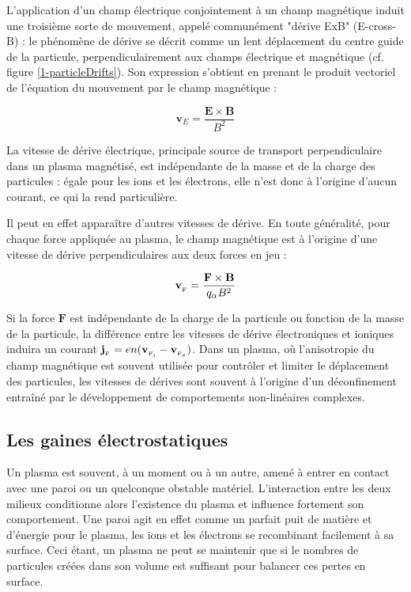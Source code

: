 \begin{refsection}
L'application d'un champ électrique conjointement à un champ magnétique
induit une troisième sorte de mouvement, appelé communément "dérive
ExB" (E-cross-B) : le phénomène de dérive se décrit comme un lent déplacement du
centre guide de la particule, perpendiculairement aux champs électrique et
magnétique (cf. figure \ref{1-particleDrifts}). Son expression s'obtient en
prenant le produit vectoriel de l'équation du mouvement par le champ magnétique
:

\begin{equation}
\mathbf{v}_E=\frac{\mathbf{E}\times\mathbf{B}}{B^2}
\end{equation}

La vitesse de dérive électrique, principale source de transport perpendiculaire
dans un plasma magnétisé, est indépendante de la masse et de la charge des
particules : égale pour les ions et les électrons, elle n'est donc à
l'origine d'aucun courant, ce qui la rend particulière. 

Il peut en effet apparaître d'autres vitesses de dérive. En toute généralité, 
pour chaque force appliquée au plasma, le champ magnétique est à l'origine
d'une vitesse de dérive perpendiculaires aux deux forces en jeu :

\begin{equation}
\mathbf{v}_{_{\text{F}}}=\frac{\mathbf{F}\times\mathbf{B}}{q_\alpha B^2}
\end{equation}

Si la force $\mathbf F$ est indépendante de la charge de la particule ou
fonction de la masse de la particule, la différence entre les vitesses de dérive
électroniques et ioniques induira un courant $\mathbf
j_{_{\text{F}}}=en(\mathbf v_{_{\text{F}_\text{i}}}-\mathbf
v_{_{\text{F}_\text{e}}})$. Dans un plasma, où l'anisotropie du champ
magnétique est souvent utilisée pour contrôler et limiter le déplacement des
particules, les vitesses de dérives sont souvent à l'origine d'un déconfinement
entraîné par le développement de comportements
non-linéaires complexes.

\subsection{Les gaines électrostatiques}
Un plasma est souvent, à un moment ou à un autre, amené à entrer en contact avec
une paroi ou un quelconque obstable matériel. L'interaction entre
les deux milieux conditionne alors l'existence du plasma et influence
fortement son comportement. Une paroi agit en effet comme un parfait
puit de matière et d'énergie pour le plasma, les ions et les électrons se
recombinant facilement à sa surface. Ceci étant, un plasma ne peut se maintenir
que si le nombres de particules créées dans son volume est suffisant pour
balancer ces pertes en surface. 


\end{refsection}
